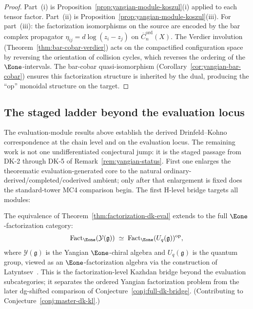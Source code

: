 \begin{proof}
Part~(i) is Proposition~\ref{prop:yangian-module-koszul}(i)
applied to each tensor factor.  Part~(ii) is
Proposition~\ref{prop:yangian-module-koszul}(iii).  For
part~(iii): the factorization isomorphisms on the source are
encoded by the bar complex propagator $\eta_{ij} = d\log(z_i - z_j)$
on $\overline{C}_n^{\mathrm{ord}}(X)$.  The Verdier involution
(Theorem~\ref{thm:bar-cobar-verdier}) acts on the
compactified configuration space by reversing the orientation of
collision cycles, which reverses the ordering of the
$\Eone$-intervals.  The bar-cobar quasi-isomorphism
(Corollary~\ref{cor:yangian-bar-cobar}) ensures this
factorization structure is inherited by the dual, producing
the ``op'' monoidal structure on the target.
\end{proof}

\subsection{The staged ladder beyond the evaluation locus}

The evaluation-module results above establish the derived
Drinfeld--Kohno correspondence at the chain level and on the
evaluation locus.  The remaining work is not one undifferentiated
conjectural jump: it is the staged passage from DK-2 through DK-5 of
Remark~\ref{rem:yangian-status}.  First one enlarges the theorematic
evaluation-generated core to the natural
ordinary-derived/completed/coderived ambient; only after that
enlargement is fixed does the standard-tower MC4 comparison begin.
The first H-level bridge targets all modules:

\begin{conjecture}\label{conj:full-derived-dk}
The equivalence of
Theorem~\textup{\ref{thm:factorization-dk-eval}} extends to the
full $\Eone$-factorization category:
\begin{equation}\label{eq:full-dk}
\operatorname{Fact}_{\Eone}(\mathcal{Y}(\mathfrak{g}))
\;\simeq\;
\operatorname{Fact}_{\Eone}(U_q(\mathfrak{g}))^{\mathrm{op}},
\end{equation}
where $\mathcal{Y}(\mathfrak{g})$ is the Yangian
$\Eone$-chiral algebra and $U_q(\mathfrak{g})$ is the quantum
group, viewed as an $\Eone$-factorization algebra via the
construction of Latyntsev~\cite{Latyntsev23}.
This is the factorization-level Kazhdan bridge beyond the evaluation
subcategories; it separates the ordered Yangian factorization problem
from the later dg-shifted comparison of
Conjecture~\ref{conj:full-dk-bridge}.
(Contributing to Conjecture~\ref{conj:master-dk-kl}.)
\end{conjecture}

